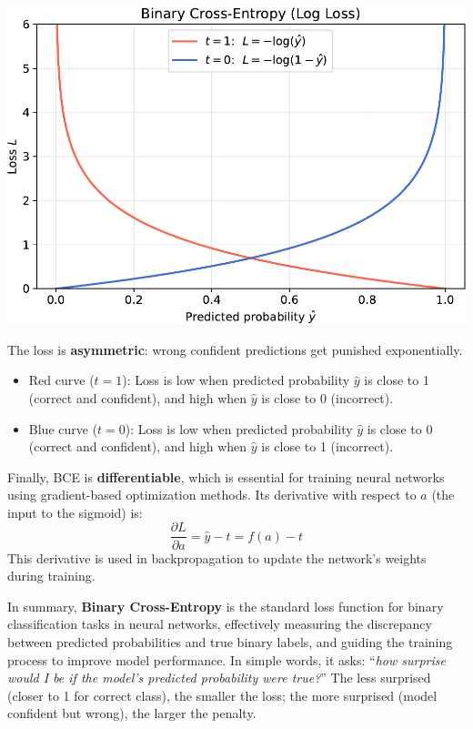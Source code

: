 \begin{deepeningbox}
    \begin{center}
        \includegraphics[width=\textwidth]{img/fnns/bce.pdf}
    \end{center}

    The loss is \textbf{asymmetric}: wrong confident predictions get punished exponentially.
    \begin{itemize}
        \item Red curve ($t=1$): Loss is low when predicted probability $\hat{y}$ is close to 1 (correct and confident), and high when $\hat{y}$ is close to 0 (incorrect).
        \item Blue curve ($t=0$): Loss is low when predicted probability $\hat{y}$ is close to 0 (correct and confident), and high when $\hat{y}$ is close to 1 (incorrect).
    \end{itemize}
    Finally, BCE is \textbf{differentiable}, which is essential for training neural networks using gradient-based optimization methods. Its derivative with respect to $a$ (the input to the sigmoid) is:
    \begin{equation}
        \frac{\partial L}{\partial a} = \hat{y} - t = f(a) - t
    \end{equation}
    This derivative is used in backpropagation to update the network's weights during training.

    \highspace
    In summary, \textbf{Binary Cross-Entropy} is the standard loss function for binary classification tasks in neural networks, effectively measuring the discrepancy between predicted probabilities and true binary labels, and guiding the training process to improve model performance. In simple words, it asks: ``\emph{how surprise would I be if the model's predicted probability were true?}'' The less surprised (closer to 1 for correct class), the smaller the loss; the more surprised (model confident but wrong), the larger the penalty.
\end{deepeningbox}